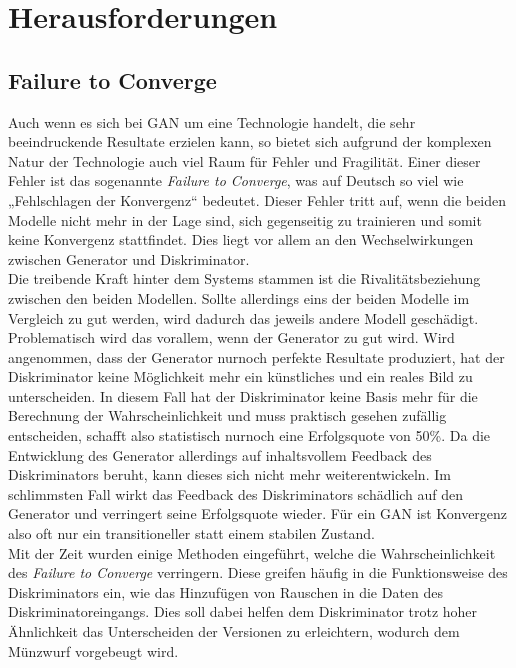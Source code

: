 \chapter{Herausforderungen}

\section{Failure to Converge}
\label{chap:FTC}

\noindent Auch wenn es sich bei \ac{GAN} um eine Technologie handelt, die sehr beeindruckende Resultate erzielen kann, so bietet sich aufgrund der komplexen Natur der Technologie auch viel Raum für Fehler und Fragilität. Einer dieser Fehler ist das sogenannte \textit{Failure to Converge}, was auf Deutsch so viel wie „Fehlschlagen der Konvergenz“ bedeutet. Dieser Fehler tritt auf, wenn die beiden Modelle nicht mehr in der Lage sind, sich gegenseitig zu trainieren und somit keine Konvergenz stattfindet. Dies liegt vor allem an den Wechselwirkungen zwischen Generator und Diskriminator. \\

\noindent Die treibende Kraft hinter dem Systems stammen ist die Rivalitätsbeziehung zwischen den beiden Modellen. Sollte allerdings eins der beiden Modelle im Vergleich zu gut werden, wird dadurch das jeweils andere Modell geschädigt. Problematisch wird das vorallem, wenn der Generator zu gut wird. Wird angenommen, dass der Generator nurnoch perfekte Resultate produziert, hat der Diskriminator keine Möglichkeit mehr ein künstliches und ein reales Bild zu unterscheiden. In diesem Fall hat der Diskriminator keine Basis mehr für die Berechnung der Wahrscheinlichkeit und muss praktisch gesehen zufällig entscheiden, schafft also statistisch nurnoch eine Erfolgsquote von 50\%. Da die Entwicklung des Generator allerdings auf inhaltsvollem Feedback des Diskriminators beruht, kann dieses sich nicht mehr weiterentwickeln. Im schlimmsten Fall wirkt das Feedback des Diskriminators schädlich auf den Generator und verringert seine Erfolgsquote wieder. Für ein \ac{GAN} ist Konvergenz also oft nur ein transitioneller statt einem stabilen Zustand. \\

\noindent Mit der Zeit wurden einige Methoden eingeführt, welche die Wahrscheinlichkeit des \textit{Failure to Converge} verringern. Diese greifen häufig in die Funktionsweise des Diskriminators ein, wie das Hinzufügen von Rauschen in die Daten des Diskriminatoreingangs. Dies soll dabei helfen dem Diskriminator trotz hoher Ähnlichkeit das Unterscheiden der Versionen zu erleichtern, wodurch dem Münzwurf vorgebeugt wird.\cite{training} \\